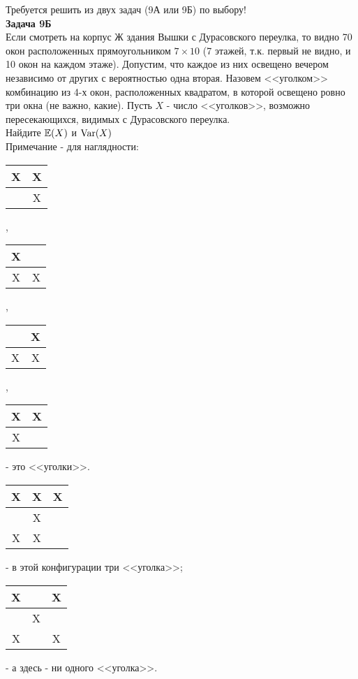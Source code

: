 \documentclass[pdftex,12pt,a4paper]{article}
\begin{document}
Требуется решить \textbf{} из двух задач (9А или 9Б) по
выбору! \\

\textbf{Задача 9Б} \\
Если смотреть на корпус Ж здания Вышки с Дурасовского переулка, то видно 70 окон расположенных прямоугольником $7\times 10$ (7 этажей, т.к. первый не видно, и 10 окон на каждом этаже). Допустим, что каждое из них освещено вечером независимо от других с вероятностью одна вторая. Назовем <<уголком>> комбинацию из 4-х окон, расположенных квадратом, в которой освещено ровно три окна (не важно, какие). Пусть $X$ - число <<уголков>>, возможно пересекающихся, видимых с Дурасовского переулка. \\
Найдите  $\mathbb{E}(X)$ и $\operatorname{Var}(X)$ \\
Примечание - для наглядности: \\
\begin{tabular}{|c|c|}
  \hline
  X & X\\
  \hline
    & X \\
  \hline
\end{tabular},
\begin{tabular}{|c|c|}
  \hline
  X & \\
  \hline
  X & X \\
  \hline
\end{tabular},
\begin{tabular}{|c|c|}
  \hline
   & X\\
  \hline
  X & X \\
  \hline
\end{tabular},
\begin{tabular}{|c|c|}
  \hline
  X & X\\
  \hline
  X &  \\
  \hline
\end{tabular} - это <<уголки>>. \\
\begin{tabular}{|c|c|c|}
  \hline
  X & X & X\\
  \hline
    & X & \\
  \hline
  X & X & \\
  \hline
 
\end{tabular} - в этой конфигурации три <<уголка>>; 
\begin{tabular}{|c|c|c|}
  \hline
  X &  & X\\
  \hline
    & X & \\
  \hline
  X &  & X\\
  \hline

\end{tabular} - а здесь - ни одного <<уголка>>. \\
\end{document}
